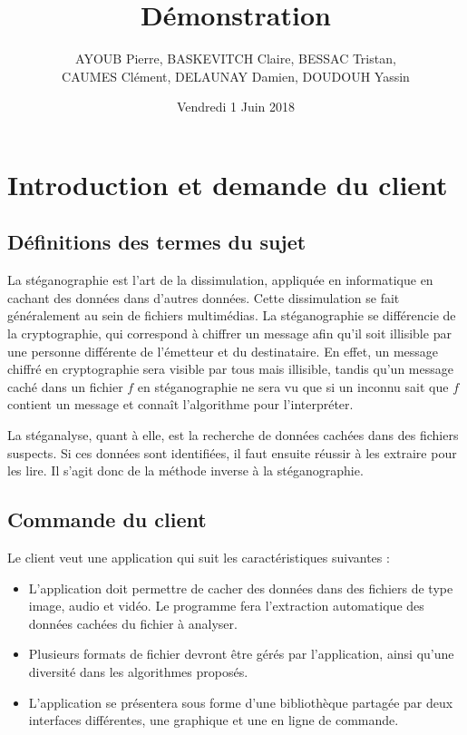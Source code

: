 \documentclass[11pt]{article}
\title{\huge{\textbf Démonstration}}
\author{AYOUB Pierre, BASKEVITCH Claire, BESSAC Tristan, \\
CAUMES Clément, DELAUNAY Damien, DOUDOUH Yassin}
\date{Vendredi 1 Juin 2018}
\begin{document}
\maketitle
\vspace{20em}
\newpage

\tableofcontents

\newpage

\section{Introduction et demande du client}

\subsection{Définitions des termes du sujet}

La stéganographie est l'art de la dissimulation, appliquée en informatique en
cachant des données dans d'autres données. Cette dissimulation se fait
généralement au sein de fichiers multimédias. La stéganographie se différencie
de la cryptographie, qui correspond à chiffrer un message afin qu'il soit
illisible par une personne différente de l'émetteur et du destinataire. En
effet, un message chiffré en cryptographie sera visible par tous mais illisible,
tandis qu'un message caché dans un fichier $f$ en stéganographie ne sera vu que
si un inconnu sait que $f$ contient un message et connaît l'algorithme pour
l'interpréter. 

La stéganalyse, quant à elle, est la recherche de données cachées dans des
fichiers suspects. Si ces données sont identifiées, il faut ensuite réussir à
les extraire pour les lire. Il s'agit donc de la méthode inverse à la
stéganographie. 

\subsection{Commande du client}

Le client veut une application qui suit les caractéristiques suivantes : 
\begin{itemize}
    \item L'application doit permettre de cacher des données dans des fichiers
        de type image, audio et vidéo. 
        Le programme fera l'extraction automatique des données cachées du 
        fichier à analyser.
    \item Plusieurs formats de fichier devront être gérés par l'application,
        ainsi qu'une diversité dans les algorithmes proposés.
    \item L'application se présentera sous forme d'une bibliothèque partagée par
        deux interfaces différentes, une graphique et une en ligne de commande.
\end{itemize}
\end{document}
